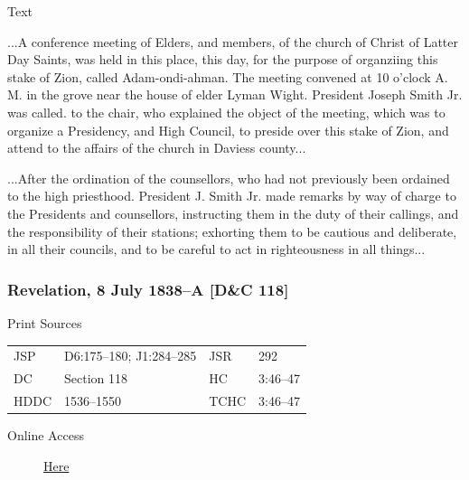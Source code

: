 				\begin{description}
					\item[Text]
				\end{description}
				
					...A conference meeting of Elders, and members, of the church of Christ of Latter Day Saints, was held in this place, this day, for the purpose of organziing this stake of Zion, called Adam-ondi-ahman. The meeting convened at 10 o'clock A. M. in the grove near the house of elder Lyman Wight. President Joseph Smith Jr. was called. to the chair, who explained the object of the meeting, which was to organize a Presidency, and High Council, to preside over this stake of Zion, and attend to the affairs of the church in Daviess county...
					
					...After the ordination of the counsellors, who had not previously been ordained to the high priesthood. President J. Smith Jr. made remarks by way of charge to the Presidents and counsellors, instructing them in the duty of their callings, and the responsibility of their stations; exhorting them to be cautious and deliberate, in all their councils, and to be careful to act in righteousness in all things...
					
		\subsubsection{Revelation, 8 July 1838--A [D\&C 118]}
			\label{EMS-1838-JS-8-JUL-1838-A}
			
			\begin{description}
					\item[Print Sources]
				\end{description}

					\begin{tabular}{p{0.5in}p{1in}p{0.5in}p{1in}}
					JSP	 	& D6:175--180; J1:284--285				& JSR 		& 292 \\
					DC	 	& Section 118		& HC 		& 3:46--47 \\
					HDDC 	& 1536--1550		& TCHC 		& 3:46--47 \\
					\end{tabular}
				
				\begin{description}
					\item[Online Access] \href{https://www.josephsmithpapers.org/paper-summary/revelation-8-july-1838-a-dc-118/1}{Here}
				\end{description}
				
